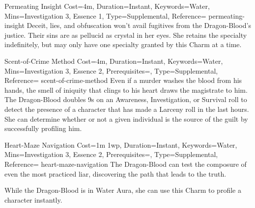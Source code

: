 
\begin{Charm}{Permeating Insight}{%
    Cost=4m,
    Duration=Instant,
    Keywords=Water,
    Mins={Investigation 3, Essence 1},
    Type=Supplemental,
    Reference=\cite*[p.~198]{db}
}{permeating-insight}
    Deceit, lies, and obfuscation won't avail fugitives from the Dragon-Blood's
    justice. Their sins are as pellucid as crystal in her eyes.  She retains the specialty
    indefinitely, but may only have one specialty granted by this Charm at a time.
\end{Charm}


\begin{Charm}{Scent-of-Crime Method}{%
    Cost=4m,
    Duration=Instant,
    Keywords=Water,
    Mins={Investigation 3, Essence 2},
    Prerequisites=,
    Type=Supplemental,
    Reference=\cite*[p.~198]{db}
}{scent-of-crime-method}
    Even if a murder washes the blood from his hands, the smell of iniquity that
    clings to his heart draws the magistrate to him. The Dragon-Blood doubles 9s on
    an Awareness, Investigation, or Survival roll to detect the presence of a
    character that has made a Larceny roll in the last  hours.
    She can determine whether or not a given individual is the source of the guilt
    by successfully profiling him.
\end{Charm}


\begin{Charm}{Heart-Maze Navigation}{%
    Cost=1m 1wp,
    Duration=Instant,
    Keywords=Water,
    Mins={Investigation 3, Essence 2},
    Prerequisites=,
    Type=Supplemental,
    Reference=\cite*[p.~198]{db}
}{heart-maze-navigation}
    The Dragon-Blood can test the composure of even the most practiced liar,
    discovering the path that leads to the truth. 

    While the Dragon-Blood is in Water Aura, she can use this Charm to profile a
    character instantly.
\end{Charm}


